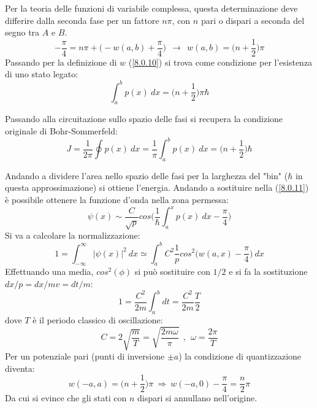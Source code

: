 \documentclass[twoside]{article}
\begin{document}
Per la teoria delle funzioni di variabile complessa, questa determinazione deve differire dalla seconda fase per un fattore $n\pi$, con $n$ pari o dispari a seconda del segno tra $A$ e $B$.
\begin{equation}
    -\frac{\pi}{4}=n\pi + \biggl( -w(a,b) +\frac{\pi}{4} \biggr) \ \ \rightarrow \ \ w(a,b)=\biggl( n+\frac{1}{2}  \biggr)\pi
\end{equation}
Passando per la definizione di $w$ (\ref{8.0.10}) si trova come condizione per l'esistenza di uno stato legato:
\begin{equation}
    \int_a ^b p(x) \ dx=\biggl( n+\frac{1}{2} \biggr)\pi \hbar
\end{equation}

Passando alla circuitazione sullo spazio delle fasi si recupera la condizione originale di Bohr-Sommerfeld:
\begin{equation}
   J=\frac{1}{2\pi} \oint p(x) \ dx =\frac{1}{\pi}\int_a ^b p(x) \ dx = \biggl( n+\frac{1}{2} \bigg)\hbar
\end{equation}

Andando a dividere l'area nello spazio delle fasi per la larghezza del "bin" ($\hbar$ in questa approssimazione) si ottiene l'energia.
Andando a sostituire nella (\ref{8.0.11}) è possibile ottenere la funzione d'onda nella zona permessa:
\begin{equation} \label{8.1.6}
    \psi(x)\sim \frac{C}{\sqrt{p}}cos\biggl( \frac{1}{\hbar}\int_a ^x p(x) \ dx -\frac{\pi}{4} \biggr)
\end{equation}
Si va a calcolare la normalizzazione:
\begin{equation}
   1 =\int_{-\infty} ^{\infty} |\psi(x)|^2 \ dx \simeq \int_a ^b C^2 \frac{1}{p} cos^2\biggl( w(a,x) - \frac{\pi}{4} \biggr) \ dx
\end{equation}
Effettuando una media, $cos^2 (\phi)$ si può sostituire con $1/2$ e si fa la sostituzione $dx/p=dx/mv=dt/m$:
\begin{equation}
    1=\frac{C^2}{2m}\int_a ^b dt=\frac{C^2}{2m}\frac{T}{2}
\end{equation}
dove $T$ è il periodo classico di oscillazione:
\begin{equation}
    C=2\sqrt{\frac{m}{T}}=\sqrt{\frac{2m\omega}{\pi}} \ \ , \ \ \omega=\frac{2\pi}{T}
\end{equation}
Per un potenziale pari (punti di inversione $\pm a$) la condizione di quantizzazione diventa:
\begin{equation}
    w(-a,a)=\biggl( n +\frac{1}{2} \biggr)\pi \ \Rightarrow \ w(-a,0)-\frac{\pi}{4}=\frac{n}{2}\pi
\end{equation}
Da cui si evince che gli stati con $n$ dispari si annullano nell'origine.
\end{document}
